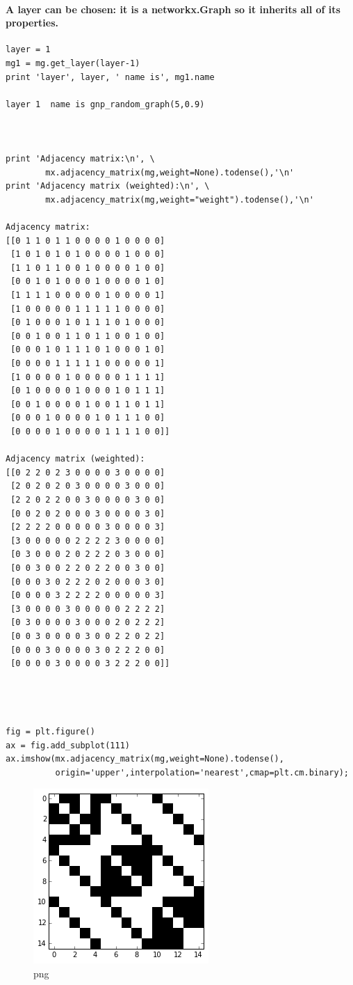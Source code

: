 \documentclass[]{article}
\begin{document}
\paragraph{A layer can be chosen: it is a networkx.Graph so it inherits
all of its
properties.}\label{a-layer-can-be-chosen-it-is-a-networkx.graph-so-it-inherits-all-of-its-properties.}

\begin{verbatim}
layer = 1
mg1 = mg.get_layer(layer-1)
print 'layer', layer, ' name is', mg1.name

layer 1  name is gnp_random_graph(5,0.9)



print 'Adjacency matrix:\n', \
        mx.adjacency_matrix(mg,weight=None).todense(),'\n'
print 'Adjacency matrix (weighted):\n', \
        mx.adjacency_matrix(mg,weight="weight").todense(),'\n'

Adjacency matrix:
[[0 1 1 0 1 1 0 0 0 0 1 0 0 0 0]
 [1 0 1 0 1 0 1 0 0 0 0 1 0 0 0]
 [1 1 0 1 1 0 0 1 0 0 0 0 1 0 0]
 [0 0 1 0 1 0 0 0 1 0 0 0 0 1 0]
 [1 1 1 1 0 0 0 0 0 1 0 0 0 0 1]
 [1 0 0 0 0 0 1 1 1 1 1 0 0 0 0]
 [0 1 0 0 0 1 0 1 1 1 0 1 0 0 0]
 [0 0 1 0 0 1 1 0 1 1 0 0 1 0 0]
 [0 0 0 1 0 1 1 1 0 1 0 0 0 1 0]
 [0 0 0 0 1 1 1 1 1 0 0 0 0 0 1]
 [1 0 0 0 0 1 0 0 0 0 0 1 1 1 1]
 [0 1 0 0 0 0 1 0 0 0 1 0 1 1 1]
 [0 0 1 0 0 0 0 1 0 0 1 1 0 1 1]
 [0 0 0 1 0 0 0 0 1 0 1 1 1 0 0]
 [0 0 0 0 1 0 0 0 0 1 1 1 1 0 0]] 

Adjacency matrix (weighted):
[[0 2 2 0 2 3 0 0 0 0 3 0 0 0 0]
 [2 0 2 0 2 0 3 0 0 0 0 3 0 0 0]
 [2 2 0 2 2 0 0 3 0 0 0 0 3 0 0]
 [0 0 2 0 2 0 0 0 3 0 0 0 0 3 0]
 [2 2 2 2 0 0 0 0 0 3 0 0 0 0 3]
 [3 0 0 0 0 0 2 2 2 2 3 0 0 0 0]
 [0 3 0 0 0 2 0 2 2 2 0 3 0 0 0]
 [0 0 3 0 0 2 2 0 2 2 0 0 3 0 0]
 [0 0 0 3 0 2 2 2 0 2 0 0 0 3 0]
 [0 0 0 0 3 2 2 2 2 0 0 0 0 0 3]
 [3 0 0 0 0 3 0 0 0 0 0 2 2 2 2]
 [0 3 0 0 0 0 3 0 0 0 2 0 2 2 2]
 [0 0 3 0 0 0 0 3 0 0 2 2 0 2 2]
 [0 0 0 3 0 0 0 0 3 0 2 2 2 0 0]
 [0 0 0 0 3 0 0 0 0 3 2 2 2 0 0]] 




fig = plt.figure()
ax = fig.add_subplot(111)
ax.imshow(mx.adjacency_matrix(mg,weight=None).todense(),
          origin='upper',interpolation='nearest',cmap=plt.cm.binary);
\end{verbatim}

\begin{figure}[htbp]
\centering
\includegraphics{output_35_0.png}
\caption{png}
\end{figure}
\end{document}
